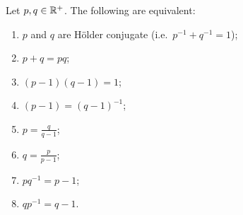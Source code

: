 \begin{lemma} \label{HoelderConjugateEquivalents}
Let $p,q\in \mathbb{R}^+$. The following are equivalent:
\begin{enumerate}
\item $p$ and $q$ are Hölder conjugate (i.e.\ $p^{-1}+q^{-1} = 1$);
\item $p+q = pq$;
\item $(p-1)(q-1) = 1$;
\item $(p-1) = (q-1)^{-1}$;
\item $p = \frac{q}{q-1}$;
\item $q = \frac{p}{p-1}$;
\item $pq^{-1} = p-1$;
\item $qp^{-1} = q-1$.
\end{enumerate}
\end{lemma}

